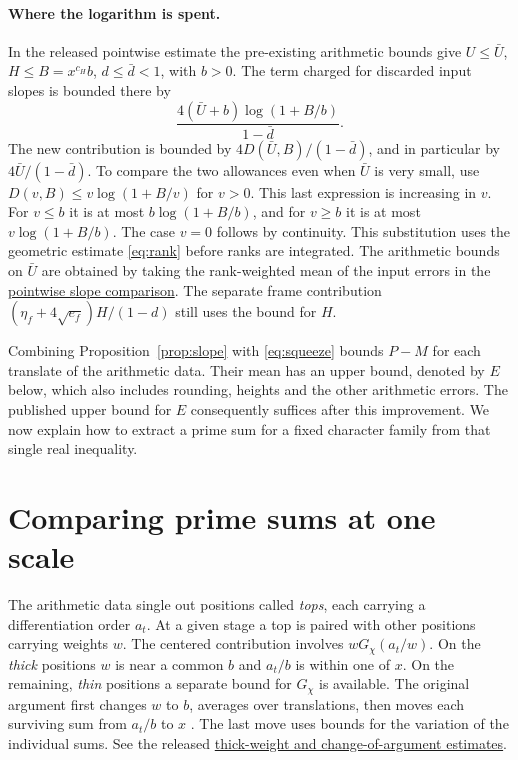 \documentclass[11pt,letterpaper]{article}
\newcommand{\src}[2]{\href{https://github.com/leanprover-community/riemann-hypothesis/blob/main/src/#1.lean}{#2}}
\numberwithin{equation}{section}
\begin{document}
\paragraph{Where the logarithm is spent.}
In the released pointwise estimate the pre-existing arithmetic bounds give \(U\le\bar U\), \(H\le B=x^{c_H}b\), \(d\le\bar d<1\), with \(b>0\). The term charged for discarded input slopes is bounded there by
\[
 \frac{4(\bar U+b)\log(1+B/b)}{1-\bar d}.
\]
The new contribution is bounded by \(4D(\bar U,B)/(1-\bar d)\), and in particular by \(4\bar U/(1-\bar d)\). To compare the two allowances even when \(\bar U\) is very small, use \(D(v,B)\le v\log(1+B/v)\) for \(v>0\). This last expression is increasing in \(v\). For \(v\le b\) it is at most \(b\log(1+B/b)\), and for \(v\ge b\) it is at most \(v\log(1+B/b)\). The case \(v=0\) follows by continuity. This substitution uses the geometric estimate \eqref{eq:rank} before ranks are integrated. The arithmetic bounds on \(\bar U\) are obtained by taking the rank-weighted mean of the input errors in the
\src{Formalism/SizeWindowBrackets/ChainSlopeWindows/LevelOfCongruence}{pointwise slope comparison}.
The separate frame contribution \((\eta_f+4\sqrt{e_f})H/(1-d)\) still uses the bound for \(H\).

Combining Proposition~\ref{prop:slope} with \eqref{eq:squeeze} bounds \(P-M\) for each translate of the arithmetic data. Their mean has an upper bound, denoted by \(E\) below, which also includes rounding, heights and the other arithmetic errors. The published upper bound for \(E\) consequently suffices after this improvement. We now explain how to extract a prime sum for a fixed character family from that single real inequality.

\section{Comparing prime sums at one scale}\label{sec:average}

The arithmetic data single out positions called \emph{tops}, each carrying a differentiation order \(a_t\). At a given stage a top is paired with other positions carrying weights \(w\). The centered contribution involves \(wG_\chi(a_t/w)\). On the \emph{thick} positions \(w\) is near a common \(b\) and \(a_t/b\) is within one of \(x\). On the remaining, \emph{thin} positions a separate bound for \(G_\chi\) is available. The original argument first changes \(w\) to \(b\), averages over translations, then moves each surviving sum from \(a_t/b\) to \(x\) \cite[\S\S3.5--3.7]{jaswal}. The last move uses bounds for the variation of the individual sums. See the released \src{Development/AutomorphicArithmetic/DedekindLFunctions/LandauTheorems/ChCore}{thick-weight and change-of-argument estimates}.
\end{document}
